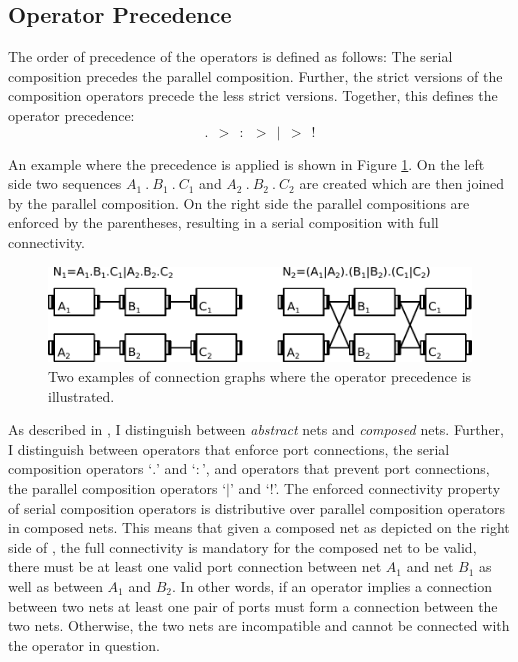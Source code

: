 \subsection{Operator Precedence}
\label{sect_smx_network_precedence}
The order of precedence of the operators is defined as follows: The serial composition precedes the parallel composition.
Further, the strict versions of the composition operators precede the less strict versions.
Together, this defines the operator precedence:
$$ . \ \ > \ \ : \ \ > \ \ | \ \ > \ \ ! $$

An example where the precedence is applied is shown in Figure \ref{fig_smx_precedence}.
On the left side two sequences $A_1 \ . \ B_1 \ . \ C_1$ and $A_2 \ . \ B_2 \ . \ C_2$ are created which are then joined by the parallel composition.
On the right side the parallel compositions are enforced by the parentheses, resulting in a serial composition with full connectivity.

\begin{figure}[bht]\begin{center}
    \TopFigSpace
    \includegraphics[width=12cm]{fig/ex_precedence2.pdf}
    \CaptionFigSpace
    \caption{Two examples of connection graphs where the operator precedence is illustrated.}
    \label{fig_smx_precedence}
    \BotFigSpace
\end{center}\end{figure}

As described in \Sect{\ref{sect_smx_network_assign}}, I distinguish between \emph{abstract} nets and \emph{composed} nets.
Further, I distinguish between operators that enforce port connections, \ie the serial composition operators `$.$' and `$:$', and operators that prevent port connections, \ie the parallel composition operators `$|$' and `$!$'.
The enforced connectivity property of serial composition operators is distributive over parallel composition operators in composed nets.
This means that given a composed net as depicted on the right side of \Fig{\ref{fig_smx_precedence}}, the full connectivity is mandatory for the composed net to be valid, \eg there must be at least one valid port connection between net $A_1$ and net $B_1$ as well as between $A_1$ and $B_2$.
In other words, if an operator implies a connection between two nets at least one pair of ports must form a connection between the two nets.
Otherwise, the two nets are incompatible and cannot be connected with the operator in question.


